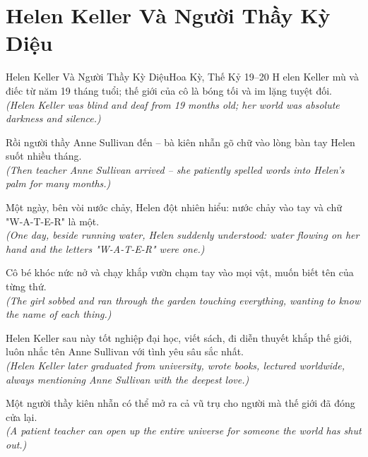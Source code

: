 \section{Helen Keller Và Người Thầy Kỳ Diệu}
\begin{truyen}{Helen Keller Và Người Thầy Kỳ Diệu}{Hoa Kỳ, Thế Kỷ 19--20}
H elen Keller mù và điếc từ năm 19 tháng tuổi; thế giới của cô là bóng tối và im lặng tuyệt đối.\\
\textit{(Helen Keller was blind and deaf from 19 months old; her world was absolute darkness and silence.)}

Rồi người thầy Anne Sullivan đến -- bà kiên nhẫn gõ chữ vào lòng bàn tay Helen suốt nhiều tháng.\\
\textit{(Then teacher Anne Sullivan arrived -- she patiently spelled words into Helen's palm for many months.)}

Một ngày, bên vòi nước chảy, Helen đột nhiên hiểu: nước chảy vào tay và chữ "W-A-T-E-R" là một.\\
\textit{(One day, beside running water, Helen suddenly understood: water flowing on her hand and the letters "W-A-T-E-R" were one.)}

Cô bé khóc nức nở và chạy khắp vườn chạm tay vào mọi vật, muốn biết tên của từng thứ.\\
\textit{(The girl sobbed and ran through the garden touching everything, wanting to know the name of each thing.)}

Helen Keller sau này tốt nghiệp đại học, viết sách, đi diễn thuyết khắp thế giới, luôn nhắc tên Anne Sullivan với tình yêu sâu sắc nhất.\\
\textit{(Helen Keller later graduated from university, wrote books, lectured worldwide, always mentioning Anne Sullivan with the deepest love.)}

\end{truyen}
\begin{baihoc}
  Một người thầy kiên nhẫn có thể mở ra cả vũ trụ cho người mà thế giới đã đóng cửa lại.\\
  \textit{(A patient teacher can open up the entire universe for someone the world has shut out.)}
\end{baihoc}
